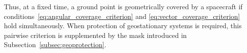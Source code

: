 Thus, at a fixed time, a ground point is geometrically covered by a spacecraft if
conditions~\eqref{eq:angular_coverage_criterion} and
\eqref{eq:vector_coverage_criterion} hold simultaneously. When protection of
geostationary systems is required, this pairwise criterion is supplemented by the
mask introduced in Subsection~\ref{subsec:geoprotection}.
